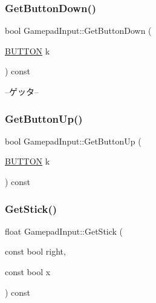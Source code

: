 \mbox{\label{class_gamepad_input_a7e7a0e3d48ce3f91332fd52c4c92bb8f}} 
\subsubsection{\texorpdfstring{Get\+Button\+Down()}{GetButtonDown()}}
{\footnotesize\ttfamily bool Gamepad\+Input\+::\+Get\+Button\+Down (\begin{DoxyParamCaption}\item[{\mbox{\hyperlink{gamepad__input_8h_a739845b0076428add52ca3cec492e705}{B\+U\+T\+T\+ON}}}]{k }\end{DoxyParamCaption}) const\hspace{0.3cm}{\ttfamily [inline]}}



--ゲッタ-- 

\mbox{\label{class_gamepad_input_a2c013028c4e0983a957666ff9922a40c}} 
\subsubsection{\texorpdfstring{Get\+Button\+Up()}{GetButtonUp()}}
{\footnotesize\ttfamily bool Gamepad\+Input\+::\+Get\+Button\+Up (\begin{DoxyParamCaption}\item[{\mbox{\hyperlink{gamepad__input_8h_a739845b0076428add52ca3cec492e705}{B\+U\+T\+T\+ON}}}]{k }\end{DoxyParamCaption}) const\hspace{0.3cm}{\ttfamily [inline]}}

\mbox{\label{class_gamepad_input_ab7e3fb80f81fcafdfc7c0f546c280929}} 
\subsubsection{\texorpdfstring{Get\+Stick()}{GetStick()}}
{\footnotesize\ttfamily float Gamepad\+Input\+::\+Get\+Stick (\begin{DoxyParamCaption}\item[{const bool}]{right,  }\item[{const bool}]{x }\end{DoxyParamCaption}) const\hspace{0.3cm}{\ttfamily [inline]}}

